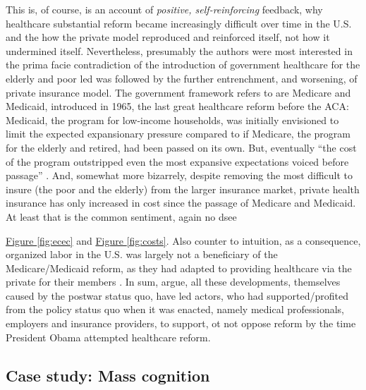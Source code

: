 \documentclass[11pt]{article}
\begin{document}
This is, of course, is an account of \textit{positive, self-reinforcing} feedback, why healthcare substantial reform became increasingly difficult over time in the U.S. and the how the private model reproduced and reinforced itself, not how it undermined itself. Nevertheless, presumably the authors were most interested in the prima facie contradiction of the introduction of government healthcare for the elderly and poor led was followed by the further entrenchment, and worsening, of private insurance model. The government framework \textcite[][]{Hacker1998} refers to are Medicare and Medicaid, introduced in 1965, the last great healthcare reform before the ACA: Medicaid, the program for low-income households, was initially envisioned to limit the expected expansionary pressure compared to if Medicare, the program for the elderly and retired, had been passed on its own. But, eventually \enquote{the cost of the program outstripped even the most expansive expectations voiced before passage} \parencite[118]{Hacker1998}. And, somewhat more bizarrely, despite removing the most difficult to insure (the poor and the elderly) from the larger insurance market, private health insurance has only increased in cost since the passage of Medicare and Medicaid.
At least that is the common sentiment, again no dsee

\hyperref[fig:ecec]{Figure \ref*{fig:ecec}} and \hyperref[fig:costs]{Figure \ref*{fig:costs}}. Also counter to intuition, as a consequence, organized labor in the U.S. was largely not a beneficiary of the Medicare/Medicaid reform, as they had adapted to providing healthcare via the private for their members \parencite[][]{Hacker1998}. In sum, \textcite[][]{Jacobs2014} argue, all these  developments, themselves caused by the postwar status quo, have led actors, who had supported/profited from the policy status quo when it was enacted, namely medical professionals, employers and insurance providers, to support, ot not oppose reform by the time President Obama attempted healthcare reform.

\subsection*{Case study: Mass cognition}
\end{document}
